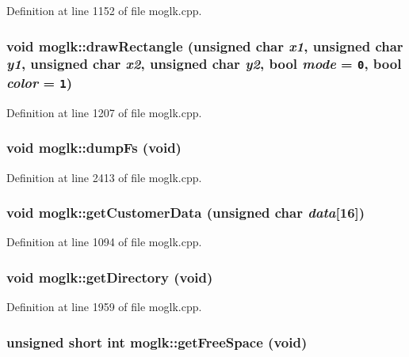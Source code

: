 Definition at line 1152 of file moglk.cpp.\hypertarget{classmoglk_df18bd7ec24c35851bc72d6d09a99483}{
\subsubsection[{drawRectangle}]{\setlength{\rightskip}{0pt plus 5cm}void moglk::drawRectangle (unsigned char {\em x1}, \/  unsigned char {\em y1}, \/  unsigned char {\em x2}, \/  unsigned char {\em y2}, \/  bool {\em mode} = {\tt 0}, \/  bool {\em color} = {\tt 1})}}
\label{classmoglk_df18bd7ec24c35851bc72d6d09a99483}




Definition at line 1207 of file moglk.cpp.\hypertarget{classmoglk_7f929ca25d08f1c116cd43152b7373f3}{
\subsubsection[{dumpFs}]{\setlength{\rightskip}{0pt plus 5cm}void moglk::dumpFs (void)}}
\label{classmoglk_7f929ca25d08f1c116cd43152b7373f3}




Definition at line 2413 of file moglk.cpp.\hypertarget{classmoglk_75192d11f9a4e9abe2ba5b31c41ca772}{
\subsubsection[{getCustomerData}]{\setlength{\rightskip}{0pt plus 5cm}void moglk::getCustomerData (unsigned char {\em data}\mbox{[}16\mbox{]})}}
\label{classmoglk_75192d11f9a4e9abe2ba5b31c41ca772}




Definition at line 1094 of file moglk.cpp.\hypertarget{classmoglk_06a6671f138121034a345e2cbd6497f8}{
\subsubsection[{getDirectory}]{\setlength{\rightskip}{0pt plus 5cm}void moglk::getDirectory (void)}}
\label{classmoglk_06a6671f138121034a345e2cbd6497f8}




Definition at line 1959 of file moglk.cpp.\hypertarget{classmoglk_8dc3413e387ae4df9e10e73bd97fbdc5}{
\subsubsection[{getFreeSpace}]{\setlength{\rightskip}{0pt plus 5cm}unsigned short int moglk::getFreeSpace (void)}}
\label{classmoglk_8dc3413e387ae4df9e10e73bd97fbdc5}




